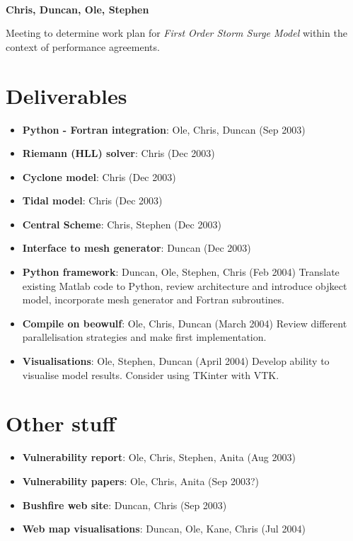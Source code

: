 \documentclass{article}
\begin{document}
\\[0.5cm]
\textbf{Chris, Duncan, Ole, Stephen}

\medskip

\noindent Meeting to determine work plan for 
\emph{First Order Storm Surge Model} within the context of 
performance agreements.


\section{Deliverables}

\begin{itemize}
  \item \textbf{Python - Fortran integration}: Ole, Chris, Duncan (Sep 2003)
  \item \textbf{Riemann (HLL) solver}: Chris (Dec 2003)  
  \item \textbf{Cyclone model}: Chris (Dec 2003)     
  \item \textbf{Tidal model}: Chris (Dec 2003)  
  \item \textbf{Central Scheme}: Chris, Stephen (Dec 2003)    
  \item \textbf{Interface to mesh generator}: Duncan (Dec 2003)
  \item \textbf{Python framework}: Duncan, Ole, Stephen, Chris (Feb 2004)     
  Translate existing Matlab code to Python, review architecture and 
  introduce objkect model, incorporate mesh generator and Fortran subroutines.
  \item \textbf{Compile on beowulf}: Ole, Chris, Duncan (March 2004)       
  Review different parallelisation strategies and make first implementation.
  \item \textbf{Visualisations}: Ole, Stephen, Duncan (April 2004)        
  Develop ability to visualise model results. Consider using TKinter with 
  VTK. 
\end{itemize} 

\section{Other stuff}

\begin{itemize}
  \item \textbf{Vulnerability report}: Ole, Chris, Stephen, Anita (Aug 2003) 
  \item \textbf{Vulnerability papers}: Ole, Chris, Anita (Sep 2003?)   
  \item \textbf{Bushfire web site}: Duncan, Chris (Sep 2003)
  \item \textbf{Web map visualisations}: Duncan, Ole, Kane, Chris (Jul 2004)  
\end{itemize}   
\end{document}
